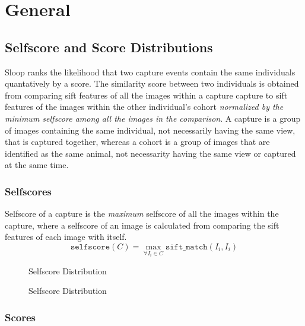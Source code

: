 \section{General}

\subsection{Selfscore and Score Distributions}

Sloop ranks the likelihood that two capture events contain the same individuals quantatively by a score. The similarity score between two individuals is obtained from comparing sift features of all the images within a capture capture to sift features of the images within the other individual's cohort \emph{normalized by the minimum selfscore among all the images in the comparison}. A capture is a group of images containing the same individual, not necessarily having the same view, that is captured together, whereas a cohort is a group of images that are identified as the same animal, not necessarity having the same view or captured at the same time.

\subsubsection{Selfscores}

Selfscore of a capture is the \emph{maximum} selfscore of all the images within the capture, where a selfscore of an image is calculated from comparing the sift features of each image with itself.
$$\texttt{selfscore}(C) = \max_{\forall I_i \in C} \texttt{sift\_match}(I_i, I_i)$$ 

\begin{figure}[h!]
  \centering
  \qquad
  \captionsetup{justification=centering}
  \caption{Selfscore Distribution}
\end{figure}

\begin{figure}[h!]
  \centering
  \qquad
  \captionsetup{justification=centering}
  \caption{Selfscore Distribution}
\end{figure}

\subsubsection{Scores}

